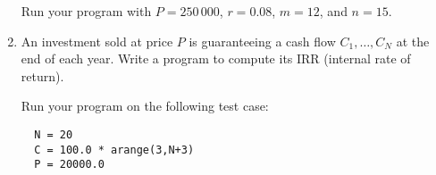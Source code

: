 \documentclass[12pt]{article}
\begin{document}
\begin{enumerate}
Run your program with $P=250\,000$, $r=0.08$,
$m=12$, and $n=15$.


\item An investment sold at price $P$ is guaranteeing a cash flow
$C_1, \dots, C_N$ at the end of each year.  Write a program to compute
its IRR (internal rate of return).

Run your program on the following test case:
\begin{verbatim}
  N = 20
  C = 100.0 * arange(3,N+3)
  P = 20000.0
\end{verbatim}

\end{enumerate}
\end{document}
